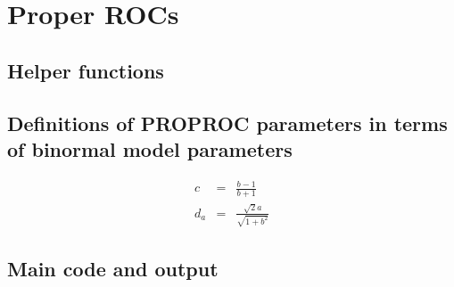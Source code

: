 \documentclass[
]{book}
\begin{document}
\hypertarget{ProperROCs}{%
\chapter{Proper ROCs}\label{ProperROCs}}

\hypertarget{helper-functions}{%
\section{Helper functions}\label{helper-functions}}

\hypertarget{definitions-of-proproc-parameters-in-terms-of-binormal-model-parameters}{%
\section{Definitions of PROPROC parameters in terms of binormal model parameters}\label{definitions-of-proproc-parameters-in-terms-of-binormal-model-parameters}}

\begin{eqnarray*}
c & = & \frac{b-1}{b+1}\\
d_a & = & \frac{\sqrt{2}a}{\sqrt{1+{b^{2}}}} 
\end{eqnarray*}

\hypertarget{main-code-and-output}{%
\section{Main code and output}\label{main-code-and-output}}
\end{document}
